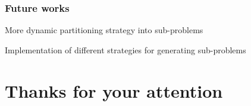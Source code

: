 \documentclass[aspectratio=169]{beamer}
\begin{document}
\begin{frame}\frametitle{Future works}

    \begin{center}
        More dynamic partitioning strategy into sub-problems 
            
        Implementation of different strategies for generating sub-problems
    \end{center}

\end{frame}

\section{Thanks for your attention}
\end{document}
